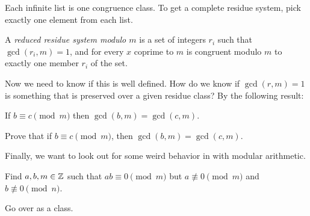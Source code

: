 \documentclass[letterpaper, 11 pt]{article}
\begin{document}
Each infinite list is one congruence class. To get a complete residue system, pick exactly one element from each list.

\begin{defn}
  A \emph{reduced residue system modulo $m$} is a set of integers $r_i$ such that $\gcd(r_i,m)=1$, and for every $x$ coprime to $m$ is congruent modulo $m$ to exactly one member $r_i$ of the set. 
\end{defn}

Now we need to know if this is well defined. How do we know if $\gcd(r,m)=1$ is something that is preserved over a given residue class? By the following result:

\begin{prop} If $b\equiv c \pmod{m}$ then $\gcd(b,m)=\gcd(c,m)$. \end{prop}
\begin{br}[5 minutes] Prove that
if $b\equiv c \pmod{m}$, then $\gcd(b,m)=\gcd(c,m)$. 
\end{br}

Finally, we want to look out for some weird behavior in with modular arithmetic.
\begin{br}[5 minutes]
 Find $a,b,m\in\mathbb Z$ such that $ab\equiv 0 \pmod m$ but $a\nequiv0\pmod m$ and $b\nequiv 0 \pmod n$.
\end{br}

Go over as a class.
\end{document}

